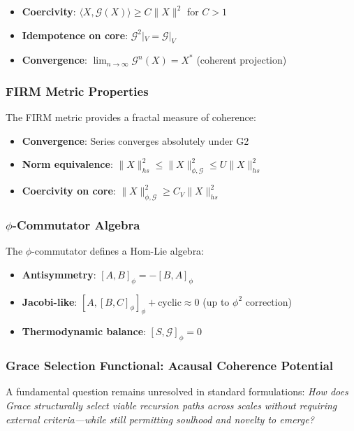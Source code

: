 \documentclass[12pt,a4paper]{article}
\begin{document}
\begin{itemize}
\item \textbf{Coercivity}: $\langle X, \mathcal{G}(X) \rangle \geq C \|X\|^2$ for $C > 1$
\item \textbf{Idempotence on core}: $\mathcal{G}^2|_V = \mathcal{G}|_V$
\item \textbf{Convergence}: $\lim_{n \to \infty} \mathcal{G}^n(X) = X^*$ (coherent projection)
\end{itemize}

\subsubsection{FIRM Metric Properties}
The FIRM metric provides a fractal measure of coherence:

\begin{itemize}
\item \textbf{Convergence}: Series converges absolutely under G2
\item \textbf{Norm equivalence}: $\|X\|_{hs}^2 \leq \|X\|_{\phi, \mathcal{G}}^2 \leq U \|X\|_{hs}^2$
\item \textbf{Coercivity on core}: $\|X\|_{\phi, \mathcal{G}}^2 \geq C_V \|X\|_{hs}^2$
\end{itemize}

\subsubsection{$\phi$-Commutator Algebra}
The $\phi$-commutator defines a Hom-Lie algebra:

\begin{itemize}
\item \textbf{Antisymmetry}: $[A, B]_\phi = -[B, A]_\phi$
\item \textbf{Jacobi-like}: $[A, [B, C]_\phi]_\phi + \text{cyclic} \approx 0$ (up to $\phi^2$ correction)
\item \textbf{Thermodynamic balance}: $[S, \mathcal{G}]_\phi = 0$
\end{itemize}

\subsubsection{Grace Selection Functional: Acausal Coherence Potential}

A fundamental question remains unresolved in standard formulations: \emph{How does Grace structurally select viable recursion paths across scales without requiring external criteria—while still permitting soulhood and novelty to emerge?}
\end{document}
